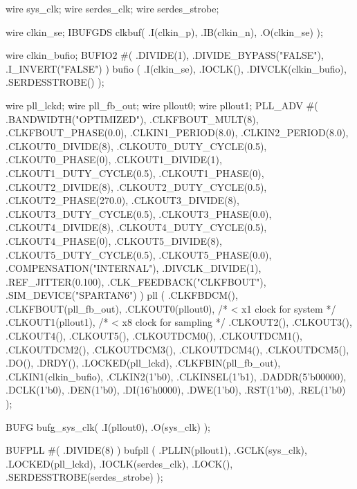 \documentclass[a4paper,11pt]{article}
\begin{document}
\begin{verbatimtab}
wire sys_clk;
wire serdes_clk;
wire serdes_strobe;

wire clkin_se;
IBUFGDS clkbuf(
	.I(clkin_p),
	.IB(clkin_n),
	.O(clkin_se)
);

wire clkin_bufio;
BUFIO2 #(
	.DIVIDE(1),
	.DIVIDE_BYPASS("FALSE"),
	.I_INVERT("FALSE")
) bufio (
	.I(clkin_se),
	.IOCLK(),
	.DIVCLK(clkin_bufio),
	.SERDESSTROBE()
);

wire pll_lckd;
wire pll_fb_out;
wire pllout0;
wire pllout1;
PLL_ADV #(
	.BANDWIDTH("OPTIMIZED"),
	.CLKFBOUT_MULT(8),
	.CLKFBOUT_PHASE(0.0),
	.CLKIN1_PERIOD(8.0),
	.CLKIN2_PERIOD(8.0),
	.CLKOUT0_DIVIDE(8),
	.CLKOUT0_DUTY_CYCLE(0.5),
	.CLKOUT0_PHASE(0),
	.CLKOUT1_DIVIDE(1),
	.CLKOUT1_DUTY_CYCLE(0.5),
	.CLKOUT1_PHASE(0),
	.CLKOUT2_DIVIDE(8),
	.CLKOUT2_DUTY_CYCLE(0.5),
	.CLKOUT2_PHASE(270.0),
	.CLKOUT3_DIVIDE(8),
	.CLKOUT3_DUTY_CYCLE(0.5),
	.CLKOUT3_PHASE(0.0),
	.CLKOUT4_DIVIDE(8),
	.CLKOUT4_DUTY_CYCLE(0.5),
	.CLKOUT4_PHASE(0),
	.CLKOUT5_DIVIDE(8),
	.CLKOUT5_DUTY_CYCLE(0.5),
	.CLKOUT5_PHASE(0.0),
	.COMPENSATION("INTERNAL"),
	.DIVCLK_DIVIDE(1),
	.REF_JITTER(0.100),
	.CLK_FEEDBACK("CLKFBOUT"),
	.SIM_DEVICE("SPARTAN6")
) pll (
	.CLKFBDCM(),
	.CLKFBOUT(pll_fb_out),
	.CLKOUT0(pllout0), /* < x1 clock for system */
	.CLKOUT1(pllout1), /* < x8 clock for sampling */
	.CLKOUT2(),
	.CLKOUT3(),
	.CLKOUT4(),
	.CLKOUT5(),
	.CLKOUTDCM0(),
	.CLKOUTDCM1(),
	.CLKOUTDCM2(),
	.CLKOUTDCM3(),
	.CLKOUTDCM4(),
	.CLKOUTDCM5(),
	.DO(),
	.DRDY(),
	.LOCKED(pll_lckd),
	.CLKFBIN(pll_fb_out),
	.CLKIN1(clkin_bufio),
	.CLKIN2(1'b0),
	.CLKINSEL(1'b1),
	.DADDR(5'b00000),
	.DCLK(1'b0),
	.DEN(1'b0),
	.DI(16'h0000),
	.DWE(1'b0),
	.RST(1'b0),
	.REL(1'b0)
);

BUFG bufg_sys_clk(
	.I(pllout0),
	.O(sys_clk)
);

BUFPLL #(
	.DIVIDE(8)
) bufpll (
	.PLLIN(pllout1),
	.GCLK(sys_clk),
	.LOCKED(pll_lckd),
	.IOCLK(serdes_clk),
	.LOCK(),
	.SERDESSTROBE(serdes_strobe)
);
\end{verbatimtab}
\end{document}
